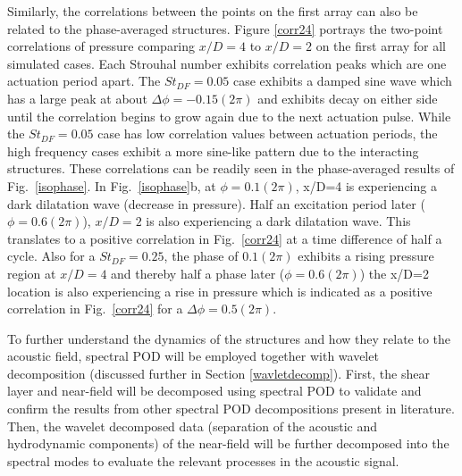 \documentclass[english]{aiaa-tc}
\begin{document}
Similarly, the correlations between the points on the first array can
also be related to the phase-averaged structures. Figure \ref{corr24}
portrays the two-point correlations of pressure comparing $x/D=4$ to
$x/D=2$ on the first array for all simulated 
cases. Each Strouhal number exhibits correlation peaks which are one
actuation period apart. The $St_{DF}=0.05$ case exhibits a damped sine wave which has a large peak
at about $\Delta \phi=-0.15(2\pi)$ 
and exhibits decay on either
side until the correlation begins to grow again due to the next
actuation pulse. While the $St_{DF}=0.05$ case has low correlation
values between actuation periods, the high frequency cases exhibit a
more sine-like pattern due to the interacting structures.  These
correlations can be readily seen in the phase-averaged results of
Fig.~\ref{isophase}. In Fig.~\ref{isophase}b, at $\phi=0.1(2\pi)$,
x/D=4 is experiencing a dark dilatation wave (decrease in pressure). 
Half an excitation period later ($\phi=0.6(2\pi)$), $x/D=2$ is also
experiencing a dark dilatation wave. This translates to a
positive correlation in Fig.~\ref{corr24} at a time difference of half
a cycle. Also for a
$St_{DF}=0.25$, the phase of $0.1(2\pi)$ exhibits a rising pressure
region at $x/D=4$ and thereby half a phase later ($\phi=0.6(2\pi)$)
the x/D=2 location is also experiencing a rise in pressure which is
indicated as a positive correlation in Fig.~\ref{corr24} for a $\Delta
\phi=0.5(2\pi)$. 

To further understand the dynamics of the structures and how they
relate to the acoustic field, spectral POD will be employed together
with wavelet decomposition (discussed further in Section
\ref{wavletdecomp}). First, the shear layer and near-field will be
decomposed using spectral POD to validate and confirm the results from
other spectral POD decompositions present in
literature.\cite{jordan2007,Arndt1997,freund2002} Then, the wavelet
decomposed data (separation of the acoustic and hydrodynamic
components) of the near-field will be further decomposed into the spectral
modes to evaluate the relevant processes in the acoustic signal. 
\end{document}
